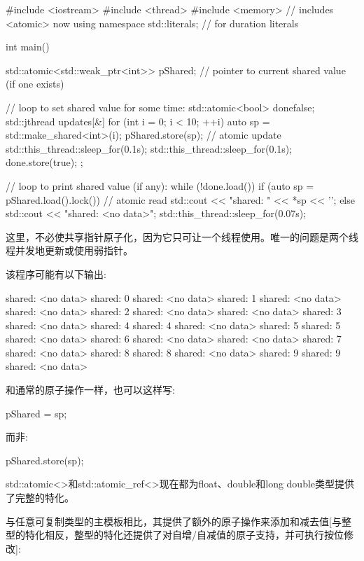 \begin{cpp}
#include <iostream>
#include <thread>
#include <memory> // includes <atomic> now
using namespace std::literals; // for duration literals

int main()
{
	std::atomic<std::weak_ptr<int>> pShared; // pointer to current shared value (if one exists)

	// loop to set shared value for some time:
	std::atomic<bool> done{false};
	std::jthread updates{[&] {
							for (int i = 0; i < 10; ++i) {
								{
									auto sp = std::make_shared<int>(i);
									pShared.store(sp); // atomic update
									std::this_thread::sleep_for(0.1s);
								}
								std::this_thread::sleep_for(0.1s);
							}
							done.store(true);
					}};

	// loop to print shared value (if any):
	while (!done.load()) {
		if (auto sp = pShared.load().lock()) { // atomic read
			std::cout << "shared: " << *sp << '\n';
		}
		else {
			std::cout << "shared: <no data>\n";
		}
		std::this_thread::sleep_for(0.07s);
	}
}
\end{cpp}

这里，不必使共享指针原子化，因为它只可让一个线程使用。唯一的问题是两个线程并发地更新或使用弱指针。

该程序可能有以下输出:

\begin{shell}
shared: <no data>
shared: 0
shared: <no data>
shared: 1
shared: <no data>
shared: <no data>
shared: 2
shared: <no data>
shared: <no data>
shared: 3
shared: <no data>
shared: 4
shared: 4
shared: <no data>
shared: 5
shared: 5
shared: <no data>
shared: 6
shared: <no data>
shared: <no data>
shared: 7
shared: <no data>
shared: 8
shared: 8
shared: <no data>
shared: 9
shared: 9
shared: <no data>
\end{shell}

和通常的原子操作一样，也可以这样写:

\begin{cpp}
pShared = sp;
\end{cpp}

而非:

\begin{cpp}
pShared.store(sp);
\end{cpp}


std::atomic<>和std::atomic\_ref<>现在都为float、double和long double类型提供了完整的特化。

与任意可复制类型的主模板相比，其提供了额外的原子操作来添加和减去值[与整型的特化相反，整型的特化还提供了对自增/自减值的原子支持，并可执行按位修改]:

